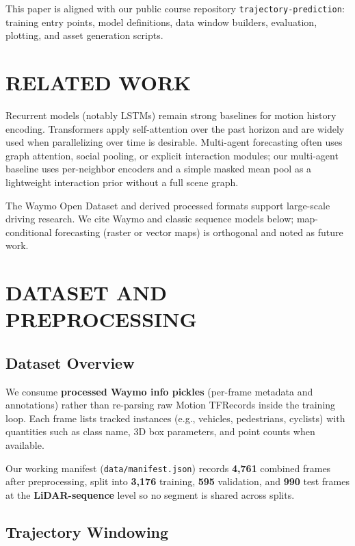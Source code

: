 \documentclass[letterpaper, 10 pt, conference]{ieeeconf}
\begin{document}
This paper is aligned with our public course repository \texttt{trajectory-prediction}: training entry points, model definitions, data window builders, evaluation, plotting, and asset generation scripts.

\section{RELATED WORK}

Recurrent models (notably LSTMs) remain strong baselines for motion history encoding. Transformers apply self-attention over the past horizon and are widely used when parallelizing over time is desirable. Multi-agent forecasting often uses graph attention, social pooling, or explicit interaction modules; our multi-agent baseline uses per-neighbor encoders and a simple masked mean pool as a lightweight interaction prior without a full scene graph.

The Waymo Open Dataset and derived processed formats support large-scale driving research. We cite Waymo and classic sequence models below; map-conditional forecasting (raster or vector maps) is orthogonal and noted as future work.

\section{DATASET AND PREPROCESSING}

\subsection{Dataset Overview}

We consume \textbf{processed Waymo info pickles} (per-frame metadata and annotations) rather than re-parsing raw Motion TFRecords inside the training loop. Each frame lists tracked instances (e.g., vehicles, pedestrians, cyclists) with quantities such as class name, 3D box parameters, and point counts when available.

Our working manifest (\texttt{data/manifest.json}) records \textbf{4{,}761} combined frames after preprocessing, split into \textbf{3{,}176} training, \textbf{595} validation, and \textbf{990} test frames at the \textbf{LiDAR-sequence} level so no segment is shared across splits.

\subsection{Trajectory Windowing}
\end{document}
